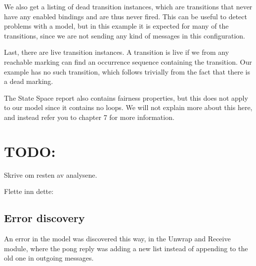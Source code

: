 	We also get a listing of dead transition instances, which are transitions that
	never have any enabled bindings and are thus never fired. This can be useful to
	detect problems with a model, but in this example it is expected for many of
	the transitions, since we are not sending any kind of messages in this configuration.
	
	Last, there are live transition instances. A transition is live if we from any
	reachable marking can find an occurrence sequence containing the transition.
	Our example has no such transition, which follows trivially from the fact that
	there is a dead marking.

	The State Space report also contains fairness properties, but this does
	not apply to our model since it contains no loops. We will not explain more
	about this here, and instead refer you to \cite{cpn_book} chapter 7 for more
	information.
	
\section{TODO:} 
Skrive om resten av analysene.

Flette inn dette:

\subsection{Error discovery}
An error in the model was discovered this way, in the Unwrap and Receive module,
where the pong reply was adding a new list instead of appending to the old one
in outgoing messages. 
